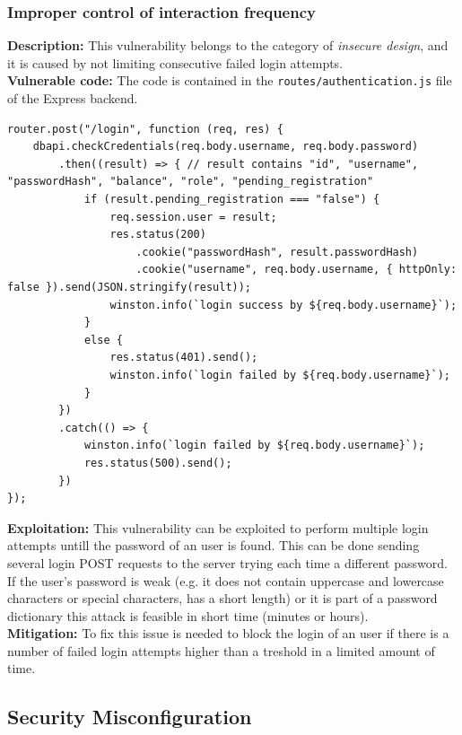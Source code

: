 \documentclass[]{article}
\begin{document}
\subsubsection{Improper control of interaction frequency}
\label{subsubsec:improper_control_of_interaction_frequency}
\textbf{Description:} This vulnerability belongs to the category of {\it insecure design}, and it is caused by not limiting consecutive failed login attempts. 
\\ 
\textbf{Vulnerable code:} The code is contained in the \texttt{routes/authentication.js} file of the Express backend.
\begin{lstlisting}
router.post("/login", function (req, res) {
    dbapi.checkCredentials(req.body.username, req.body.password)
        .then((result) => { // result contains "id", "username", "passwordHash", "balance", "role", "pending_registration"
            if (result.pending_registration === "false") {
                req.session.user = result;                                                                 
                res.status(200)
                    .cookie("passwordHash", result.passwordHash)
                    .cookie("username", req.body.username, { httpOnly: false }).send(JSON.stringify(result)); 
                winston.info(`login success by ${req.body.username}`);
            }
            else {     
                res.status(401).send();
                winston.info(`login failed by ${req.body.username}`);
            }
        })
        .catch(() => {
            winston.info(`login failed by ${req.body.username}`);
            res.status(500).send();
        })
});
\end{lstlisting}
\textbf{Exploitation:}
This vulnerability can be exploited to perform multiple login attempts untill the password of an user is found. This can be done sending 
several login POST requests to the server trying each time a different password. If the user's password is weak (e.g. it does not contain 
uppercase and lowercase characters or special characters, has a short length) or it is part of a password dictionary this attack is feasible 
in short time (minutes or hours). 
\\
\textbf{Mitigation:}
To fix this issue is needed to block the login of an user if there is a number of failed login attempts higher than a treshold in a limited amount of time.

\subsection{Security Misconfiguration}
\end{document}
